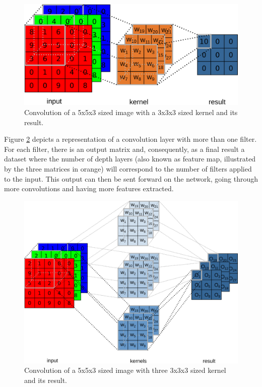 \begin{figure}
    \centering
    \includegraphics[scale=0.35]{images/figure118.png}
    \caption{Convolution of a 5x5x3 sized image with a 3x3x3 sized kernel and its result.} 
    \label{fig:figure118}
\end{figure}

Figure \ref{fig:figure119} depicts a representation of a convolution layer with more than one filter. For each filter, there is an output matrix and, consequently, as a final result a dataset where the number of depth layers (also known as feature map, illustrated by the three matrices in orange) will correspond to the number of filters applied to the input. This output can then be sent forward on the network, going through more convolutions and having more features extracted.

\begin{figure}
    \centering
    \includegraphics[scale=0.25]{images/figure119.png}
    \caption{Convolution of a 5x5x3 sized image with three 3x3x3 sized kernel and its result.}
    \label{fig:figure119}
\end{figure}

